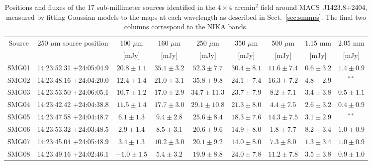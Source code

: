 \documentclass[traditabstract]{aa}
\begin{document}
\begin{table}[h]
\caption{\footnotesize Positions and fluxes of the 17 sub-millimeter sources identified in the $4 \times 4$ arcmin$^2$ field around \mbox{MACS~J1423.8+2404}, measured by fitting Gaussian models to the maps at each wavelength as described in Sect.~\ref{sec:smmps}. The final two columns correspond to the NIKA bands.}
\begin{center}
\begin{tabular}{ccccccccc}
\hline
\hline
Source & 250 $\mu$m source position & 100 $\mu$m & 160 $\mu$m & 250 $\mu$m & 350 $\mu$m & 500 $\mu$m & 1.15 mm & 2.05 mm \\
 &  & [mJy] & [mJy] & [mJy] & [mJy] & [mJy] & [mJy] & [mJy] \\
\hline
SMG01 & 14:23:52.31 +24:05:04.9 & $    20.8 \pm      1.1$ & $    35.1 \pm      3.2$ & $    52.3 \pm      7.7$ & $    30.4 \pm      8.1$ & $    11.6 \pm      7.4$ & $     0.6 \pm      3.2$ & $     1.4 \pm      0.9$ \\
SMG02 & 14:23:48.16 +24:04:20.0 & $    12.4 \pm      1.4$ & $    21.0 \pm      3.1$ & $    35.8 \pm      9.8$ & $    24.1 \pm      7.4$ & $    16.3 \pm      7.2$ & $     4.8 \pm      2.9$ & $^{**}$ \\
SMG03 & 14:23:53.50 +24:06:05.1 & $    10.7 \pm      1.2$ & $    17.0 \pm      2.9$ & $    34.7 \pm     11.3$ & $    23.7 \pm      7.9$ & $     8.2 \pm      7.1$ & $     3.4 \pm      3.8$ & $     0.5 \pm      1.1$ \\
SMG04 & 14:23:42.42 +24:04:38.8 & $    11.5 \pm      1.4$ & $    17.7 \pm      3.0$ & $    29.1 \pm     10.8$ & $    21.3 \pm      8.0$ & $     4.4 \pm      7.5$ & $     2.6 \pm      3.2$ & $     0.4 \pm      0.9$ \\
SMG05 & 14:23:47.58 +24:04:48.7 & $     6.1 \pm      1.3$ & $     9.4 \pm      2.8$ & $    25.6 \pm      8.4$ & $    18.3 \pm      7.6$ & $    14.3 \pm      7.5$ & $     3.1 \pm      2.9$ & $^{**}$ \\
SMG06 & 14:23:53.32 +24:03:48.5 & $     2.9 \pm      1.4$ & $     8.5 \pm      3.1$ & $    20.6 \pm      9.6$ & $    14.9 \pm      8.0$ & $     1.8 \pm      7.7$ & $     8.2 \pm      3.4$ & $     1.0 \pm      0.9$ \\
SMG07 & 14:23:45.04 +24:05:48.9 & $     3.4 \pm      1.3$ & $    10.2 \pm      3.0$ & $    20.1 \pm      9.2$ & $    14.0 \pm      8.0$ & $     7.3 \pm      8.0$ & $     1.3 \pm      3.4$ & $     1.0 \pm      0.9$ \\
SMG08 & 14:23:49.16 +24:02:46.1 & $    -1.0 \pm      1.5$ & $     5.4 \pm      3.2$ & $    19.9 \pm      8.8$ & $    24.0 \pm      7.8$ & $    11.2 \pm      7.8$ & $     3.5 \pm      3.8$ & $     0.9 \pm      1.0$ \\

\end{tabular}
\end{center}
\end{table}
\end{document}
